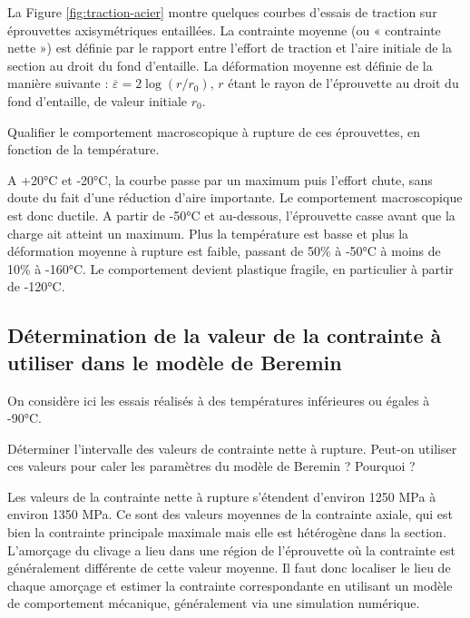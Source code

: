 La Figure \ref{fig:traction-acier} montre quelques courbes d’essais de traction sur éprouvettes axisymétriques entaillées. La
contrainte moyenne (ou « contrainte nette ») est définie par le rapport entre l’effort de traction et l’aire
initiale de la section au droit du fond d’entaille. La déformation moyenne est définie de la manière
suivante : $\overline{\varepsilon} = 2\log(r/r_0)$, $r$ étant le rayon de l’éprouvette au droit du fond d’entaille, de valeur initiale $r_0$.

\begin{questions}
\question Qualifier le comportement macroscopique à rupture de ces éprouvettes, en fonction de la température.

\begin{solution}
A +20°C et -20°C, la courbe passe par un maximum puis l’effort chute, sans doute du fait d’une
réduction d’aire importante. Le comportement macroscopique est donc ductile.
A partir de -50°C et au-dessous, l’éprouvette casse avant que la charge ait atteint un maximum. Plus la
température est basse et plus la déformation moyenne à rupture est faible, passant de 50\% à -50°C à
moins de 10\% à -160°C. Le comportement devient plastique fragile, en particulier à partir de -120°C.
\end{solution}

\subsection{Détermination de la valeur de la contrainte à utiliser dans le modèle de Beremin}
On considère ici les essais réalisés à des températures inférieures ou égales à -90°C.

\question Déterminer l’intervalle des valeurs de contrainte nette à rupture. Peut-on utiliser ces valeurs pour caler les paramètres du modèle de Beremin ? Pourquoi ?
\begin{solution}
Les valeurs de la contrainte nette à rupture s’étendent d’environ 1250 MPa à environ 1350 MPa. Ce sont des valeurs moyennes de la contrainte axiale, qui est bien la contrainte principale maximale mais elle est hétérogène dans la section. L’amorçage du clivage a lieu dans une région de l’éprouvette où la contrainte est généralement différente de cette valeur moyenne. Il faut donc localiser le lieu de chaque amorçage et estimer la contrainte correspondante en utilisant un modèle de comportement mécanique, généralement via une simulation numérique.
\end{solution}


\end{questions}
